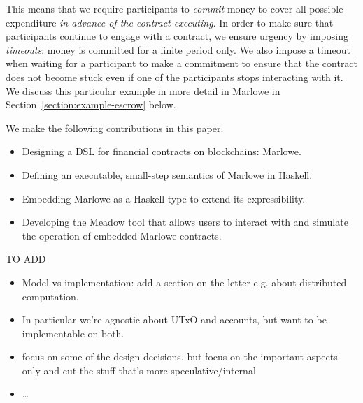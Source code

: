\documentclass[runningheads]{llncs}
\begin{document}
This means that we require participants to \emph{commit} money to cover all possible expenditure \emph{in advance of the 
contract executing}. In order to make sure that participants continue to engage with a contract, we ensure urgency by 
imposing \emph{timeouts}: money is committed for a finite period only. We also impose a timeout when  waiting for a participant to make a 
commitment to ensure that the contract does not become stuck even if one of the 
participants stops interacting with it. We discuss this particular example in more detail in Marlowe in Section~\ref{section:example-escrow} below.

We make the following contributions in this paper.
\begin{itemize}
\item
Designing a DSL for financial contracts on blockchains: Marlowe.
\item
Defining an executable, small-step semantics of Marlowe in Haskell.
\item 
Embedding Marlowe as a Haskell  type to extend its expressibility.
\item
Developing the Meadow tool that allows users to interact with and simulate the operation of embedded Marlowe contracts. 
\end{itemize}

TO ADD
\begin{itemize}
\item 
Model vs implementation: add a section on the letter e.g. about distributed computation.
\item
In particular we're agnostic about UTxO and accounts, but want to be implementable on both.
\item
focus on some of the design decisions, but focus on the important aspects only and cut the stuff that's  more speculative/internal
\item  
\ldots
\end{itemize}


%
 
\end{document}
